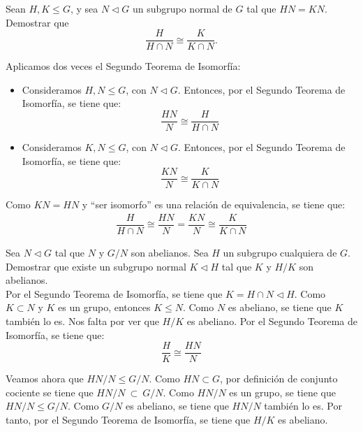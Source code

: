 \begin{ejercicio}
    Sean $H,K\leq G$, y sea $N\lhd G$ un subgrupo normal de $G$ tal que $HN=KN$. Demostrar que
    \[
        \frac{H}{H\cap N}\cong \frac{K}{K\cap N}.
    \]

    Aplicamos dos veces el Segundo Teorema de Isomorfía:
    \begin{itemize}
        \item Consideramos $H,N\leq G$, con $N\lhd G$. Entonces, por el Segundo Teorema de Isomorfía, se tiene que:
        \begin{equation*}
            \dfrac{HN}{N} \cong \dfrac{H}{H\cap N}
        \end{equation*}
        \item Consideramos $K,N\leq G$, con $N\lhd G$. Entonces, por el Segundo Teorema de Isomorfía, se tiene que:
        \begin{equation*}
            \dfrac{KN}{N} \cong \dfrac{K}{K\cap N}
        \end{equation*}
    \end{itemize}

    Como $KN=HN$ y ``ser isomorfo'' es una relación de equivalencia, se tiene que:
    \begin{align*}
        \dfrac{H}{H\cap N} \cong \dfrac{HN}{N} = \dfrac{KN}{N} \cong \dfrac{K}{K\cap N}
    \end{align*}
\end{ejercicio}

\begin{ejercicio}
    Sea $N\lhd G$ tal que $N$ y $G/N$ son abelianos. Sea $H$ un subgrupo cualquiera de $G$. Demostrar que existe un subgrupo normal $K\lhd H$ tal que $K$ y $H/K$ son abelianos.\\

    Por el Segundo Teorema de Isomorfía, se tiene que $K=H\cap N\lhd H$. Como $K\subset N$ y $K$ es un grupo, entonces $K\leq N$. Como $N$ es abeliano, se tiene que $K$ también lo es. Nos falta por ver que $H/K$ es abeliano. Por el Segundo Teorema de Isomorfía, se tiene que:
    \begin{equation*}
        \dfrac{H}{K} \cong \dfrac{HN}{N}
    \end{equation*}

    Veamos ahora que $HN/N\leq G/N$. Como $HN\subset G$, por definición de conjunto cociente se tiene que $HN/N \ \subset\ G/N$. Como $HN/N$ es un grupo, se tiene que $HN/N\leq G/N$. Como $G/N$ es abeliano, se tiene que $HN/N$ también lo es. Por tanto, por el Segundo Teorema de Isomorfía, se tiene que $H/K$ es abeliano.
\end{ejercicio}

